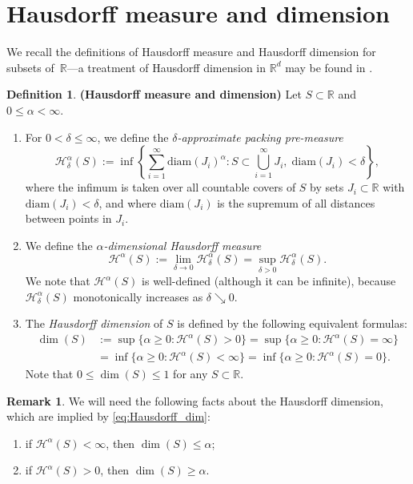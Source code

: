 \documentclass[oneside,final,11pt]{amsart}
\theoremstyle{definition}
\newtheorem{rem}[thm]{Remark}
\newtheorem{defn}[thm]{Definition} \newtheorem{ex}[thm]{Example}
\newcommand{\thmtitle}[1]{{\bf(#1)}}
\newcommand{\diam}{\mathrm{diam}}
\newcommand{\R}{\mathbb{R}}
\newcommand{\CH}{\mathcal{H}}
\newcommand{\1}[1]{\mathbf{1}_{#1}}
\numberwithin{equation}{section}
\begin{document}
\section{Hausdorff measure and dimension}
\label{sec:Hausdorff}

We recall the definitions of Hausdorff measure and Hausdorff dimension for subsets of~$\R$---a treatment of Hausdorff dimension in $\R^d$ may be found in \cite[Section~4]{Mattila}.

\begin{defn}\thmtitle{Hausdorff measure and dimension} %
 Let $S \subset \R$ and $0 \leq \alpha < \infty$.
\begin{enumerate}
\item For $0 < \delta \leq \infty$, we define the \emph{$\delta$-approximate packing pre-measure}
\begin{equation}\label{eq:pre-measure}
\CH^\alpha_\delta(S) := \inf \left\{ \sum_{i = 1}^\infty \diam (J_i)^\alpha : S \subset \bigcup_{i = 1}^\infty J_i,\; \diam (J_i) < \delta \right\},
\end{equation}
where the infimum is taken over all countable covers of $S$ by sets $J_i \subset \R$ with $\diam(J_i) < \delta$, and where $\diam(J_i)$ is the supremum of all distances between points in $J_i$.
\item We define the \emph{$\alpha$-dimensional Hausdorff measure}
\begin{equation}\label{eq:measure}
\CH^\alpha(S) := \lim_{\delta \to 0} \CH^\alpha_\delta(S) = \sup_{\delta > 0} \CH^\alpha_\delta(S).
\end{equation}
We note that $\CH^\alpha(S)$ is well-defined (although it can be infinite), because $\CH^\alpha_\delta(S)$ monotonically increases as $\delta \searrow 0$.
\item The \emph{Hausdorff dimension} of $S$ is defined by the following equivalent formulas:
\begin{align}\label{eq:Hausdorff_dim}
\dim(S) &:= \sup \{\alpha \geq 0 : \CH^\alpha(S) > 0\} = \sup \{\alpha \geq 0 : \CH^\alpha(S) = \infty\} \\
&= \inf \{\alpha \geq 0 : \CH^\alpha(S) < \infty\} = \inf \{\alpha \geq 0 : \CH^\alpha(S) = 0\}.
\end{align}
Note that $0 \leq \dim(S) \leq 1$ for any $S \subset \R$.
\end{enumerate}
\end{defn}

\begin{rem}\label{rem:dimension}
We will need the following facts about the Hausdorff dimension, which are implied by \eqref{eq:Hausdorff_dim}:
\begin{enumerate}
\item if $\CH^\alpha(S) < \infty$, then $\dim(S) \leq \alpha$;
\item\label{it:2} if $\CH^\alpha(S) > 0$, then $\dim(S) \geq \alpha$.
\end{enumerate}
\end{rem}
\end{document}
